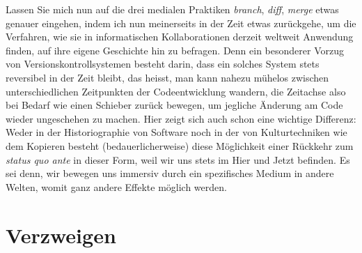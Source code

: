 \documentclass[a4paper,12pt]{article}
\begin{document}
Lassen Sie mich nun auf die drei medialen Praktiken \emph{branch}, \emph{diff}, \emph{merge} etwas genauer eingehen, indem ich nun meinerseits in der Zeit etwas zurückgehe, um die Verfahren, wie sie in informatischen Kollaborationen derzeit weltweit Anwendung finden, auf ihre eigene Geschichte hin zu befragen. Denn ein besonderer Vorzug von Versionskontrollsystemen besteht darin, dass ein solches System stets reversibel in der Zeit bleibt, das heisst, man kann nahezu mühelos zwischen unterschiedlichen Zeitpunkten der Codeentwicklung wandern, die Zeitachse also bei Bedarf wie einen Schieber zurück bewegen, um jegliche Änderung am Code wieder ungeschehen zu machen. Hier zeigt sich auch schon eine wichtige Differenz: Weder in der Historiographie von Software noch in der von Kulturtechniken wie dem Kopieren besteht (bedauerlicherweise) diese Möglichkeit einer Rückkehr zum \emph{status quo ante} in dieser Form, weil wir uns stets im Hier und Jetzt befinden. Es sei denn, wir bewegen uns immersiv durch ein spezifisches Medium in andere Welten, womit ganz andere Effekte möglich werden. %


\begin{comment}

Von der kurzen Geschichte der Sofware zur langen Geschichte der kollektiven Autorschaft. 

Konfliktlösung
Vorteil: Das Zurückgehen in der Zeit. 

Graphentheoretische Darstellung. Beispiel. Briefroman Gefährliche Liebschaften
Source Control. Kontrolle behalten über die Quellen. 

Kurze Erklärung anhand von \verb+https://en.wikipedia.org/wiki/Version_control+


Interessant: Statt single und zentralisiert, gibt's das System noch als \verb+https://en.wikipedia.org/wiki/Distributed_version_control+

\verb+https://en.wikipedia.org/wiki/Comparison_of_version_control_software#History_and_adoption+

\end{comment}


\section{Verzweigen}
\end{document}
